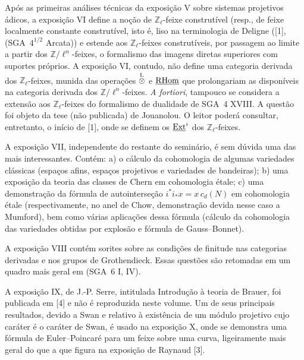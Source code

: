 Após as primeiras análises técnicas da exposição V sobre sistemas projetivos ádicos, a exposição VI define a noção de $\mathbb Z_\ell$-feixe construtível (resp., de feixe localmente constante construtível, isto é, liso na terminologia de Deligne ([1], (SGA~$4^{1/2}$ Arcata)) e estende aos $\mathbb Z_\ell$-feixes construtíveis, por passagem ao limite a partir dos $\mathbb Z/\ell^n$-feixes, o formalismo das imagens diretas superiores com suportes próprios. A exposição VI, contudo, não define uma categoria derivada dos $\mathbb Z_\ell$-feixes, munida das operações $\overset{\mathrm L}{\otimes}$ e $\underline{\mathrm{RHom}}$ que prolongariam as disponíveis na categoria derivada dos $\mathbb Z/\ell^n$-feixes. \emph{A fortiori}, tampouco se considera a extensão aos $\mathbb Z_\ell$-feixes do formalismo de dualidade de SGA~4 XVIII. A questão foi objeto da tese (não publicada) de Jouanolou. O leitor poderá consultar, entretanto, o início de [1], onde se definem os $\underline{\operatorname{Ext}}^i$ dos $\mathbb Z_\ell$-feixes.

A exposição VII, independente do restante do seminário, é sem dúvida uma das mais interessantes. Contém: a) o cálculo da cohomologia de algumas variedades clássicas (espaços afins, espaços projetivos e variedades de bandeiras); b) uma exposição da teoria das classes de Chern em cohomologia étale; c) uma demonstração da fórmula de autointerseção $i^*i_*x=x\,c_d(N)$ em cohomologia étale (respectivamente, no anel de Chow, demonstração devida nesse caso a Mumford), bem como várias aplicações dessa fórmula (cálculo da cohomologia das variedades obtidas por explosão e fórmula de Gauss--Bonnet).

A exposição VIII contém sorites sobre as condições de finitude nas categorias derivadas e nos grupos de Grothendieck. Essas questões são retomadas em um quadro mais geral em (SGA~6 I, IV).

A exposição IX, de J.-P. Serre, intitulada Introdução à teoria de Brauer, foi publicada em [4] e não é reproduzida neste volume. Um de seus principais resultados, devido a Swan e relativo à existência de um módulo projetivo cujo caráter é o caráter de Swan, é usado na exposição X, onde se demonstra uma fórmula de Euler--Poincaré para um feixe sobre uma curva, ligeiramente mais geral do que a que figura na exposição de Raynaud [3].

